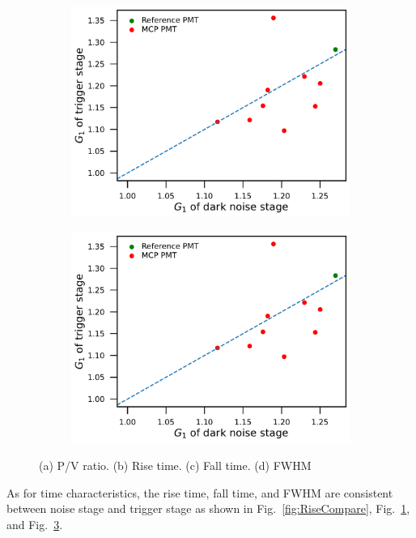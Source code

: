 \begin{figure}[!htbp]
    \begin{subfigure}[b]{0.49\textwidth}
        \includegraphics[width=\textwidth,page=7]{figures/result/compare.pdf}
        \caption{}
        \label{fig:FallCompare}
    \end{subfigure}
    \begin{subfigure}[b]{0.49\textwidth}
        \includegraphics[width=\textwidth,page=8]{figures/result/compare.pdf}
        \caption{}
        \label{fig:FWHMCompare}
    \end{subfigure}
    \caption{(a) P/V ratio. (b) Rise time. (c) Fall time. (d) FWHM}
\end{figure}

As for time characteristics, the rise time, fall time, and FWHM are consistent between noise stage and trigger stage as shown in Fig.~\ref{fig:RiseCompare}, Fig.~\ref{fig:FallCompare}, and Fig.~\ref{fig:FWHMCompare}.

